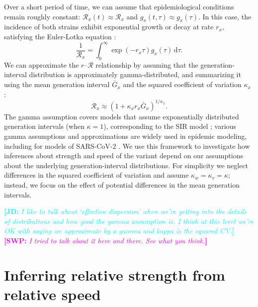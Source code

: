 \documentclass[12pt]{article}
\newcommand{\comment}{\showcomment}
\newcommand{\showcomment}[3]{\textcolor{#1}{\textbf{[#2: }\textsl{#3}\textbf{]}}}
\newcommand{\jd}[1]{\comment{cyan}{JD}{#1}}
\newcommand{\swp}[1]{\comment{magenta}{SWP}{#1}}
\newcommand{\RR}{\ensuremath{{\mathcal R}}\xspace}
\newcommand{\dd}[1]{\ensuremath{\, \mathrm{d}#1}}
\newcommand{\dtau}{\dd{\tau}}
\begin{document}
Over a short period of time, we can assume that epidemiological conditions remain roughly constant: $\RR_x(t) \approx \RR_x$ and $g_x(t, \tau) \approx g_x(\tau)$.
In this case, the incidence of both strains exhibit exponential growth or decay at rate $r_x$, satisfying the Euler-Lotka equation \citep{wallinga2007generation}:
\begin{equation}
\frac{1}{\RR_x} = \int_0^\infty \exp(- r_x \tau) g_x(\tau) \dtau.
\end{equation}
We can approximate the $r$--$\RR$ relationship by assuming that the generation-interval distribution is approximately gamma-distributed, and summarizing it using the mean generation interval $\bar{G}_x$ and the squared coefficient of variation $\kappa_x$ \citep{park2019practical}:
\begin{equation}
\RR_x \approx (1 + \kappa_x r_x \bar{G}_x)^{1/\kappa_x}.
\end{equation}
The gamma assumption covers models that assume exponentially distributed generation intervals (when $\kappa=1$), corresponding to the SIR model \citep{anderson1991infectious}; various gamma assumptions and approximations are widely used in epidemic modeling, including for models of SARS-CoV-2 \citep{doi:10.1098/rsif.2020.0144}.
We use this framework to investigate how inferences about strength and speed of the variant depend on our assumptions about the underlying generation-interval distributions.
For simplicity we neglect differences in the squared coefficient of variation and assume $\kappa_w = \kappa_v = \kappa$; instead, we focus on the effect of potential differences in the mean generation intervals.

\jd{I like to talk about `effective dispersion' when we're getting into the details of distributions and how good the gamma assumption is. I think at this level we're OK with saying we approximate by a gamma and kappa is the squared CV.}
\swp{I tried to talk about it here and there. See what you think.}

\section{Inferring relative strength from relative speed}
\end{document}
